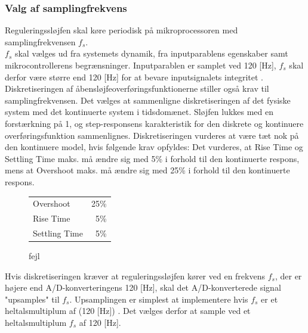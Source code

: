 \subsubsection{Valg af samplingfrekvens}\label{subsec:choosefs}
Reguleringssløjfen skal køre periodisk på mikroprocessoren
med samplingfrekvensen \(f_s\). \\
\(f_s\) skal vælges
ud fra systemets dynamik,
fra inputparablens egenskaber samt 
mikrocontrollerens begrænsninger. 
Inputparablen er samplet ved 120 [Hz], 
\(f_s\) skal derfor være større end 120 [Hz] for at bevare inputsignalets integritet \citep[Side. XXX]{dsp}. 
Diskretiseringen af åbensløjfeoverføringsfunktionerne stiller også krav til samplingfrekvensen.
Det vælges at sammenligne diskretiseringen af det fysiske system med det kontinuerte system i tidsdomænet.
Sløjfen lukkes med en forstærkning på 1, 
og step-responsens karakteristik for den diskrete og kontinuere overføringsfunktion sammenlignes. 
Diskretiseringen vurderes at være tæt nok på den kontinuere model, hvis følgende krav opfyldes:
Det vurderes, at Rise Time og Settling Time maks. må ændre sig med 5\% i forhold
til den kontinuerte respons, mens at Overshoot maks. må ændre sig med 25\% i forhold til
den kontinuerte respons.

\begin{figure}
 \centering
\begin{tabular}{lr}
 Overshoot & 25\%\\
 Rise Time & 5\%\\
 Settling Time & 5\%\\
\end{tabular}
\caption{fejl}
\end{figure}

Hvis diskretiseringen kræver at reguleringssløjfen kører ved en frekvens \(f_s\),
der er højere end A/D-konverteringens 120 [Hz], skal det A/D-konverterede
signal "upsamples" til \(f_s\).
Upsamplingen er simplest at implementere
hvis \(f_s\) er et heltalsmultiplum af (120 [Hz]) \citep[Side. 562]{dsp}.
Det vælges derfor at sample ved et heltalsmultiplum \(f_s\) af 120 [Hz].

